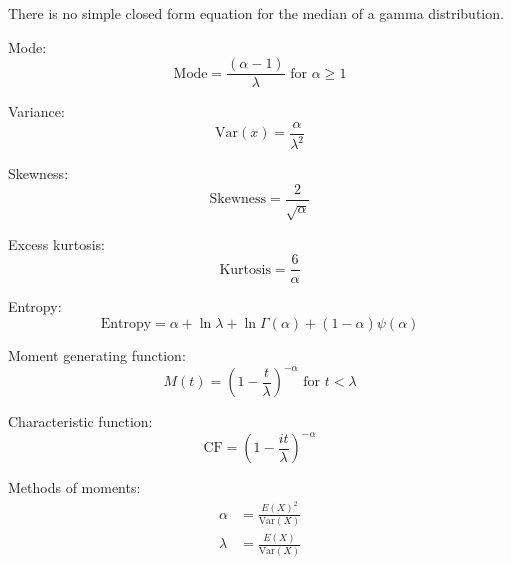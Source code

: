 \documentclass[12pt]{article}
\begin{document}
\noindent There is no simple closed form equation for the median of a gamma distribution.

\noindent Mode:
\begin{equation}\label{eq:gamma-mode-2}
	\text{Mode} = \frac{(\alpha-1)}{\lambda}\text{ for }\alpha \geq 1
\end{equation}

\noindent Variance:
\begin{equation}\label{eq:gamma-variance-2}
	\text{Var}(x) = \frac{\alpha}{\lambda^2}
\end{equation}

\noindent Skewness:
\begin{equation}\label{eq:gamma-skewness-2}
	\text{Skewness} = \frac{2}{\sqrt{\alpha}}
\end{equation}

\noindent Excess kurtosis:
\begin{equation}\label{eq:gamma-kurtosis-2}
	\text{Kurtosis} = \frac{6}{\alpha}
\end{equation}

\noindent Entropy:
\begin{equation}\label{eq:gamma-entropy-2}
	\text{Entropy} = \alpha + \ln{\lambda} + \ln{\Gamma(\alpha)} + (1-\alpha)\psi(\alpha)
\end{equation}

\noindent Moment generating function:
\begin{equation}\label{eq:gamma-mgf-2}
	M(t) = \left(1-\frac{t}{\lambda}\right)^{-\alpha}\text{ for }t < \lambda
\end{equation}

\noindent Characteristic function:
\begin{equation}\label{eq:gamma-cf-2}
	\text{CF} = \left(1-\frac{it}{\lambda}\right)^{-\alpha}
\end{equation}

\noindent Methods of moments:
\begin{equation}\label{eq:gamma-mom-2}
	\begin{split}
		\alpha	&=	\frac{E(X)^2}{\text{Var}(X)}\\
		\lambda	&=	\frac{E(X)}{\text{Var}(X)}
	\end{split}
\end{equation}

\pagebreak

\begin{appendix}
	\listoffigures
	\listoftables
\end{appendix}

\pagebreak{}\printbibliography[heading=bibintoc,title={References}]
\end{document}

